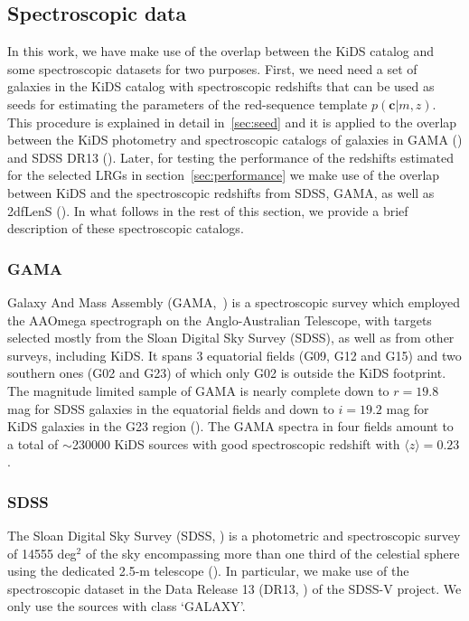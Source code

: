 \documentclass[fleqn,usenatbib]{mnras}
\newcommand{\vc}{\bm{c}}
\begin{document}
\subsection{Spectroscopic data}\label{sec:spec}

In this work, we have make use of the overlap between the KiDS catalog and some spectroscopic datasets for two purposes. First, we need need a set of galaxies in the KiDS catalog with spectroscopic redshifts that can be used as seeds for estimating the parameters of the red-sequence template $p(\vc|m,z)$. This procedure is explained in detail in~\ref{sec:seed} and it is applied to the overlap between the KiDS photometry and spectroscopic catalogs of galaxies in GAMA (\citealt{driver2011}) and SDSS DR13 (\citealt{sdss_dr13}). Later, for testing the performance of the redshifts estimated for the selected LRGs in section~\ref{sec:performance} we make use of the overlap between KiDS and the spectroscopic redshifts from SDSS, GAMA, as well as 2dfLenS (\citealt{blake2016}).
In what follows in the rest of this section, we provide a brief description of these spectroscopic catalogs.
\subsubsection{GAMA}
Galaxy And Mass Assembly (GAMA,~\citealt{driver2011}) is a spectroscopic survey  which employed the AAOmega spectrograph on the Anglo-Australian Telescope,
with targets selected mostly from the Sloan Digital Sky Survey
(SDSS), as well as from other surveys, including KiDS. It spans
3 equatorial fields (G09, G12 and G15) and two southern ones
(G02 and G23) of which only G02 is outside the KiDS footprint. 
The magnitude limited sample of GAMA is nearly 
complete down to $r=19.8$ mag for SDSS galaxies in the equatorial fields and down to $i=19.2$ mag for KiDS galaxies in the G23 region (\citealt{likse2015}).  
The GAMA spectra in four fields amount to a total of $\sim$230000 KiDS sources with good spectroscopic redshift with $\langle z \rangle = 0.23$. 

\subsubsection{SDSS}

The Sloan Digital Sky Survey (SDSS, \citealt{york2000}) is a photometric and spectroscopic survey of 14555 deg$^2$ of the sky encompassing more than one third of the celestial sphere using the dedicated 2.5-m telescope (\citealt{gunn2006}). In particular, we make use of the spectroscopic dataset in the Data Release 13 (DR13, \citealt{sdss_dr13}) of the SDSS-V project. We only use the sources with class `GALAXY'. 
\end{document}
